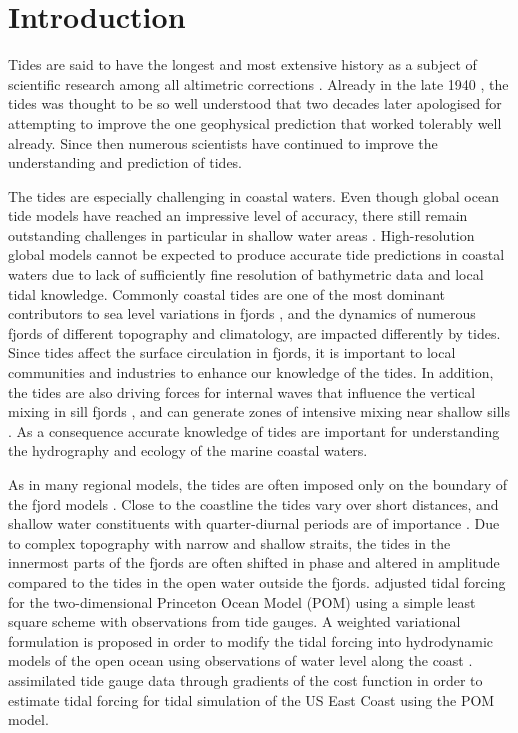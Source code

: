 \section{Introduction}

Tides are said to have the longest and most extensive history as a subject of scientific research among all altimetric corrections \cite[]{egbert94,cartwright77,hendershott81}. 
Already in the late 1940 \citep{unna47}, the tides was thought to be so well understood that two decades later \cite{munk66} apologised for attempting to improve the one geophysical prediction that worked tolerably well already. Since then numerous scientists have continued to improve the understanding and prediction of tides. 

The tides are especially challenging in coastal waters. Even though global ocean tide models have reached an impressive level of accuracy, there still remain outstanding challenges in particular in shallow water areas \citep{stammer14}. High-resolution global models cannot be expected to produce accurate tide predictions in coastal waters due to lack of sufficiently fine resolution of  bathymetric data and local tidal knowledge. Commonly coastal tides are one of the most dominant contributors to sea level variations in fjords \citep[e.g.][]{grabbe09}, and the dynamics of numerous fjords of different topography and climatology, are impacted differently by tides. Since tides affect the surface circulation in fjords, it is important to local communities and industries to enhance our knowledge of the tides. In addition, the tides are also driving forces for internal waves that influence the vertical mixing in sill fjords \citep{stigebrandt76}, and can generate zones of intensive mixing near shallow sills \citep{staal15}. As a consequence accurate knowledge of tides are important for understanding the hydrography and ecology of the marine coastal waters.

As in many regional models, the tides are often imposed only on the boundary of the fjord models \citep{gjevik89,carniello05,lynge13}. Close to the coastline the tides vary over short distances, and shallow water constituents with quarter-diurnal periods are of importance \citep[e.g.][for the case of the Oslofjord, Norway]{trygg74}. 
Due to complex topography with narrow and shallow straits, the tides in the innermost parts of the fjords are often shifted in phase and altered in amplitude compared to the tides in the open water outside the fjords. \cite{chen99} adjusted tidal forcing for the two-dimensional Princeton Ocean Model (POM) using a simple least square scheme with observations from tide gauges. A weighted variational formulation is proposed in order to modify the tidal forcing into hydrodynamic models of the open ocean using observations of water level along the coast \citep{bennett82}. \cite{zhang03} assimilated tide gauge data through gradients of the cost function in order to estimate tidal forcing for tidal simulation of the US East Coast using the POM model.

